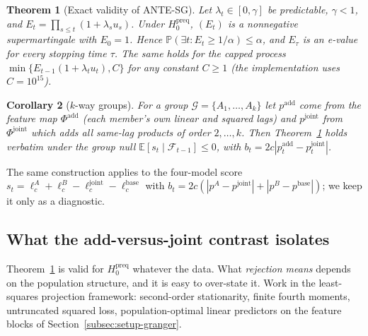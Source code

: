 \documentclass[pdflatex,sn-mathphys-ay]{sn-jnl}%
\theoremstyle{thmstyleone}%
\newtheorem{theorem}{Theorem}%
\newtheorem{corollary}[theorem]{Corollary}%
\theoremstyle{thmstyletwo}%
\theoremstyle{thmstylethree}%
\newcommand{\E}{\mathbb{E}}
\newcommand{\Prob}{\mathbb{P}}
\newcommand{\F}{\mathcal{F}}
\begin{document}
\begin{theorem}[Exact validity of ANTE-SG]\label{thm:sgvalid}
Let $\lambda_t\in[0,\gamma]$ be predictable, $\gamma<1$, and
$E_t=\prod_{s\le t}(1+\lambda_su_s)$. Under $H_0^{\mathrm{preq}}$, $(E_t)$ is a nonnegative
supermartingale with $E_0=1$. Hence $\Prob(\exists t:E_t\ge1/\alpha)\le\alpha$, and $E_\tau$ is
an e-value for every stopping time $\tau$. The same holds for the capped process
$\min\{E_{t-1}(1+\lambda_tu_t),C\}$ for any constant $C\ge1$ (the implementation uses
$C=10^{15}$).
\end{theorem}

\begin{corollary}[$k$-way groups]\label{cor:group}
For a group $\mathcal G=\{A_1,\dots,A_k\}$ let $p^{\mathrm{add}}$ come from the feature map
$\Phi^{\mathrm{add}}$ (each member's own linear and squared lags) and $p^{\mathrm{joint}}$ from
$\Phi^{\mathrm{joint}}$ which adds all same-lag products of order $2,\dots,k$. Then
Theorem~\ref{thm:sgvalid} holds verbatim under the group null
$\E[s_t\mid\F_{t-1}]\le0$, with $b_t=2c|p^{\mathrm{add}}_t-p^{\mathrm{joint}}_t|$.
\end{corollary}

The same construction applies to the four-model score
$s_t=\ell_c^A+\ell_c^B-\ell_c^{\mathrm{joint}}-\ell_c^{\mathrm{base}}$ with
$b_t=2c(|p^A-p^{\mathrm{joint}}|+|p^B-p^{\mathrm{base}}|)$; we keep it only as a diagnostic.

\subsection{What the add-versus-joint contrast isolates}\label{subsec:isolation}

Theorem~\ref{thm:sgvalid} is valid for $H_0^{\mathrm{preq}}$ whatever the data. What
\emph{rejection means} depends on the population structure, and it is easy to over-state it. Work in the least-squares projection framework: second-order
stationarity, finite fourth moments, untruncated squared loss, population-optimal linear
predictors on the feature blocks of Section~\ref{subsec:setup-granger}.
\end{document}
